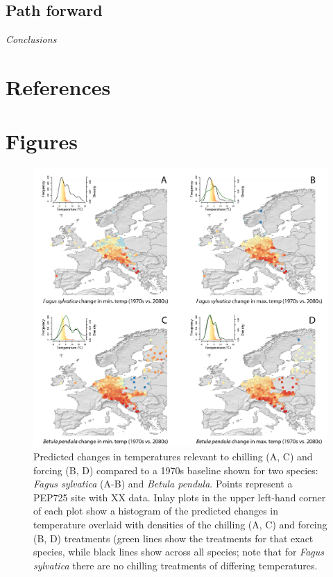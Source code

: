 \documentclass[11pt,letter]{article}
\begin{document}
\subsection{Path forward}

\emph{Conclusions}

\section{References}



\section{Figures}

\newpage
\begin{figure}[t!]
\centering
\includegraphics[width=1\textwidth]{figures/Fig1_noblues_densities.png}
\caption{Predicted changes in temperatures relevant to chilling (A, C) and forcing (B, D) compared to a 1970s baseline shown for two species: \emph{Fagus sylvatica} (A-B) and \emph{Betula pendula}. Points represent a PEP725 site with XX data. Inlay plots in the upper left-hand corner of each plot show a histogram of the predicted changes in temperature overlaid with densities of the chilling (A, C) and forcing (B, D) treatments (green lines show the treatments for that exact species, while black lines show across all species; note that for \emph{Fagus sylvatica} there are no chilling treatments of differing temperatures.}
  \label{fig:pep}
\end{figure}
\clearpage
\end{document}
